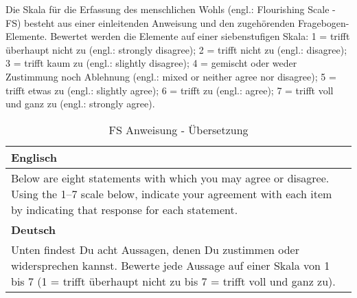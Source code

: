 \begin{RaggedRight}
Die Skala für die Erfassung des menschlichen Wohls (engl.: Flourishing Scale - FS) \cite{Diener:2010} besteht aus einer einleitenden Anweisung und den zugehörenden Fragebogen-Elemente. Bewertet werden die Elemente auf einer siebenstufigen Skala: 1 = trifft überhaupt nicht zu (engl.: strongly disagree); 2 = trifft nicht zu (engl.: disagree); 3 = trifft kaum zu (engl.: slightly disagree); 4 = gemischt oder weder Zustimmung noch Ablehnung (engl.: mixed or neither agree nor disagree); 5 = trifft etwas zu (engl.: slightly agree); 6 = trifft zu (engl.: agree); 7 = trifft voll und ganz zu (engl.: strongly agree).

\begin{center}
    \begin{longtable}[t]{|p{15 cm}|}
    \caption{FS Anweisung - Übersetzung} \\ \hline
        \textbf{Englisch} \\ \hline
        Below are eight statements with which you may agree or disagree. Using the 1–7 scale below, indicate your agreement with each item by indicating that response for each statement. \\ \hline
        \textbf{Deutsch} \\ \hline 
        Unten findest Du acht Aussagen, denen Du zustimmen oder widersprechen kannst. Bewerte jede Aussage auf einer Skala von 1 bis 7 (1 = trifft überhaupt nicht zu bis 7 = trifft voll und ganz zu). \\ \hline   
    \end{longtable}
	\label{tab:FsAnweisung}
\end{center}


\end{RaggedRight}

